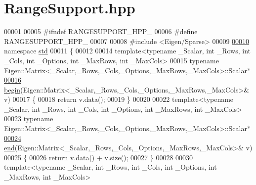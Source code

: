 \hypertarget{RangeSupport_8hpp_source}{}\section{Range\+Support.\+hpp}
\label{RangeSupport_8hpp_source}

\begin{DoxyCode}
00001 
00005 \textcolor{preprocessor}{#ifndef RANGESUPPORT\_HPP\_}
00006 \textcolor{preprocessor}{#define RANGESUPPORT\_HPP\_}
00007 
00008 \textcolor{preprocessor}{#include <Eigen/Sparse>}
00009 
\hypertarget{RangeSupport_8hpp_source.tex_l00010}{}\hyperlink{namespacestd}{00010} \textcolor{keyword}{namespace }\hyperlink{namespacestd}{std}
00011 \{
00012 
00014 \textcolor{keyword}{template}<\textcolor{keyword}{typename} \_Scalar, \textcolor{keywordtype}{int} \_Rows, \textcolor{keywordtype}{int} \_Cols, \textcolor{keywordtype}{int} \_Options, \textcolor{keywordtype}{int} \_MaxRows, \textcolor{keywordtype}{int} \_MaxCols>
00015 \textcolor{keyword}{typename} Eigen::Matrix<\_Scalar,\_Rows,\_Cols,\_Options,\_MaxRows,\_MaxCols>::Scalar*
\hypertarget{RangeSupport_8hpp_source.tex_l00016}{}\hyperlink{namespacestd_acec9a198880c12f51f02be95a298a48b}{00016} \hyperlink{namespacestd_acec9a198880c12f51f02be95a298a48b}{begin}(Eigen::Matrix<\_Scalar,\_Rows,\_Cols,\_Options,\_MaxRows,\_MaxCols>& v)
00017 \{
00018   \textcolor{keywordflow}{return} v.data();
00019 \}
00020 
00022 \textcolor{keyword}{template}<\textcolor{keyword}{typename} \_Scalar, \textcolor{keywordtype}{int} \_Rows, \textcolor{keywordtype}{int} \_Cols, \textcolor{keywordtype}{int} \_Options, \textcolor{keywordtype}{int} \_MaxRows, \textcolor{keywordtype}{int} \_MaxCols>
00023 \textcolor{keyword}{typename} Eigen::Matrix<\_Scalar,\_Rows,\_Cols,\_Options,\_MaxRows,\_MaxCols>::Scalar*
\hypertarget{RangeSupport_8hpp_source.tex_l00024}{}\hyperlink{namespacestd_aeb4b319cf9afda99ba1f47d32df15bc9}{00024} \hyperlink{namespacestd_aeb4b319cf9afda99ba1f47d32df15bc9}{end}(Eigen::Matrix<\_Scalar,\_Rows,\_Cols,\_Options,\_MaxRows,\_MaxCols>& v)
00025 \{
00026   \textcolor{keywordflow}{return} v.data() + v.size();
00027 \}
00028 
00030 \textcolor{keyword}{template}<\textcolor{keyword}{typename} \_Scalar, \textcolor{keywordtype}{int} \_Rows, \textcolor{keywordtype}{int} \_Cols, \textcolor{keywordtype}{int} \_Options, \textcolor{keywordtype}{int} \_MaxRows, \textcolor{keywordtype}{int} \_MaxCols>

\end{DoxyCode}
